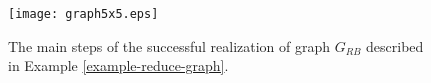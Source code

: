 \documentclass{llncs}
\newcommand{\grb}{$G_{RB}$ }
\begin{document}
\begin{comment}
Let $r$ be the root node of the tree.  Assign $new$ to the root. Then let $(new, newnode) $ be a new edge of the tree
\begin{itemize}

\item  label $(new, newnode)$ with the character $c$ that is realized  in a component $C$ of the red-black graph
 and  if species $s$ is realized then label node $new$ with species $s$. If  the component has still unrealized characters, then move $new$ to $newnode$. If the component is split into components $C_1, \cdots, C_l$, then for each of these components create edge $(new, newnode_i)$ and apply recursively the procedure on each component graph $C_i$ from the root node $newnode_i$,

\item if the negated character $c$ is free then add a new edge $(new, newnode)$ from node $new$ labeled with
$\bar{c}$,


\end{itemize}

\end{comment}


\begin{figure}[ptb]
\begin{center}
\texttt{[image: graph5x5.eps]}
\end{center}
\caption{The main steps of the successful realization of  graph \grb   described in Example \ref{example-reduce-graph}.}
\label{graph}
\end{figure}
\end{document}
